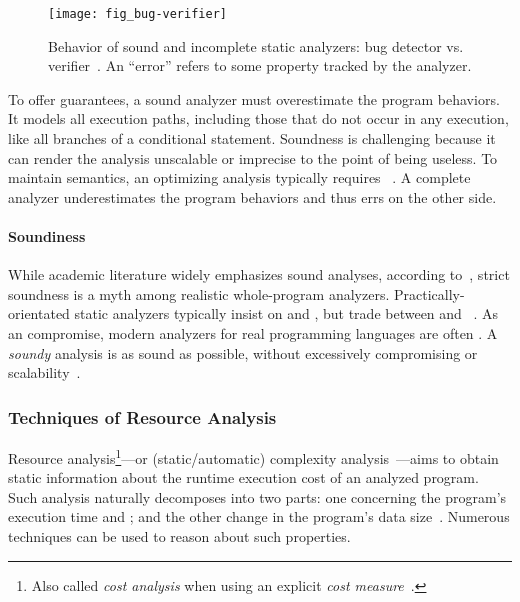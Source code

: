 \begin{figure}[t]
\centering
\texttt{[image: fig\_bug-verifier]}
\caption[Sound and incomplete bug detector vs. verifier]{
Behavior of sound and incomplete static analyzers: bug detector vs.
verifier~\cite{moller2024}. An \enquote{error} refers to some property tracked
by the analyzer.}
\label{fig:bug-verify}
\end{figure}

To offer guarantees, a sound analyzer must overestimate the program behaviors.
It models all execution paths, including those that do not occur in any
execution, like all branches of a conditional statement.
Soundness is challenging because it can render the analysis
unscalable or imprecise to the point of being useless. To maintain semantics, an
optimizing analysis typically requires ~\cite[p. 5]{moller2023}.
A complete analyzer underestimates the program behaviors and
thus errs on the other side.

\paragraph*{Soundiness}
While academic literature widely emphasizes sound analyses, according
to~\textcite{livshits2015}, strict soundness is a myth among realistic
whole-program analyzers. Practically-orientated static analyzers typically
insist on  and , but trade between
 and ~\cite{moller2023,steffen2020}. As an
compromise, modern analyzers for real programming languages are often
. A \emph{soundy} analysis is as sound as possible, without
excessively compromising  or scalability~\cite{livshits2015}.

\subsubsection{Techniques of Resource Analysis}
\label{resource-analysis}

Resource analysis\footnote{ Also called \emph{cost
analysis} when using an explicit \emph{cost measure}~\cite{albert2008}. }---or
(static/automatic) {complexity analysis}~\cite{rosendahl1989,leivant2013}---aims
to obtain static information about the runtime {execution cost} of an analyzed
program. Such analysis naturally decomposes into two parts: one concerning the
program's execution time and ; and the other change in the
program's data size~\cite{jones2009}. Numerous techniques can be used to reason
about such properties.

